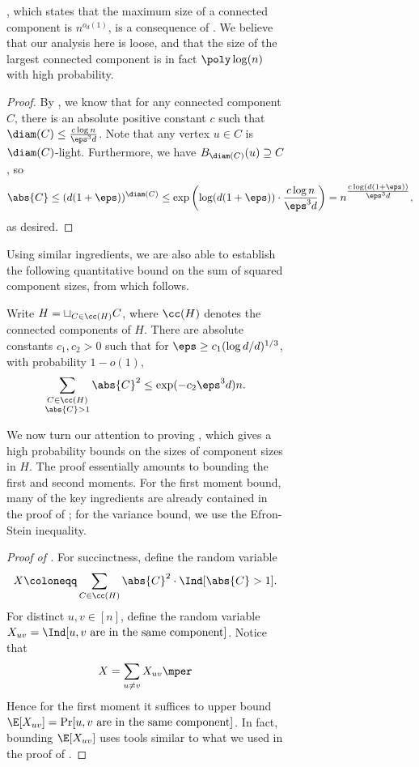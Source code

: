 \documentclass[11pt,letterpaper]{article}
\begin{document}
\begin{figure}
\begin{figure}
, which states that the maximum size of a connected component is $n^{o_d(1)}$, is a consequence of . 
\singlecomp*
We believe that our analysis here is loose, and that the size of the largest connected component is in fact $\poly\log(n)$ with high probability.
\begin{proof}
    By , we know that for any connected component $C$, there is an absolute positive constant $c$ such that $\diam(C) \le \frac{c\log n}{\eps^3 d}$. 
    Note that any vertex $u \in C$ is $\diam(C)$-light. 
    Furthermore, we have $B_{\diam(C)}(u) \supseteq C$, so 
    \[
        \abs{C} \le (d(1+\eps))^{\diam(C)} \le \exp\left(\log(d(1+\eps)) \cdot \frac{c\log n}{\eps^3 d}\right) = n^{\tfrac{c\log(d(1+\eps))}{\eps^3 d}},
    \]
    as desired.
\end{proof}

Using similar ingredients, we are also able to establish the following quantitative bound on the sum of squared component sizes, from which  follows.
\begin{lemma}\label{lem:component-size-precise}
    Write $H = \sqcup_{C \in \cc(H)} C$, where $\cc(H)$ denotes the connected components of $H$. 
    There are absolute constants $c_1, c_2 > 0$ such that for $\eps \ge c_1(\log d/d)^{1/3}$, with probability $1-o(1)$, 
    \[
        \sum_{\substack{C \in \cc(H) \\ \abs{C} > 1}} \abs{C}^2 \le \exp(-c_2 \eps^3 d)n.
    \]
\end{lemma}

We now turn our attention to proving , which gives a high probability bounds on the sizes of component sizes in $H$. 
The proof essentially amounts to bounding the first and second moments. 
For the first moment bound, many of the key ingredients are already contained in the proof of ; for the variance bound, we use the Efron-Stein inequality. 

\begin{proof}[Proof of ]
    For succinctness, define the random variable 
    \begin{align*}
        X \coloneqq \sum_{C \in \cc(H)} \abs{C}^2 \cdot \Ind[\abs{C} > 1].
    \end{align*}
    For distinct $u, v \in [n]$, define the random variable $X_{uv} = \Ind[u, v \text{ are in the same component}]$. 
    Notice that 
    \begin{align*}
        X = \sum_{u \neq v} X_{uv}\mper
    \end{align*}
    Hence for the first moment it suffices to upper bound $\E[X_{uv}] = \Pr[u, v \text{ are in the same component}]$. 
    In fact, bounding $\E[X_{uv}]$ uses tools similar to what we used in the proof of .


\end{proof}
\end{figure}
\end{figure}
\end{document}
